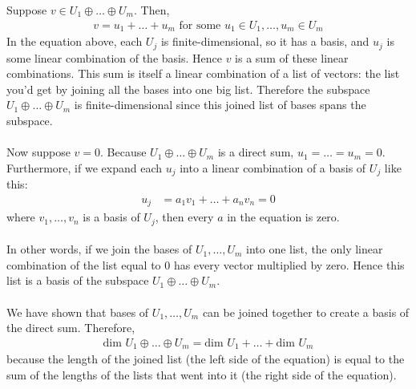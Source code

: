 \documentclass[a4paper]{article}
\begin{document}
\Large
Suppose $v \in U_1 \oplus \dots \oplus U_m$. Then, 
\begin{align*}
    v = u_1 + \dots + u_m \text{ for some } u_1 \in U_1, \dots, u_m \in U_m
\end{align*}
In the equation above, each $U_j$ is finite-dimensional, so it has a basis, and $u_j$ is some linear combination of the basis.
Hence $v$ is a sum of these linear combinations.
This sum is itself a linear combination of a list of vectors: the list you'd get by joining all the bases into one big list.
Therefore the subspace $U_1\oplus\dots\oplus U_m$ is finite-dimensional since this joined list of bases spans the subspace.
\\
\\
Now suppose $v=0$.
Because $U_1\oplus\dots\oplus U_m$ is a direct sum, $u_1=\dots=u_m=0$.
Furthermore, if we expand each $u_j$ into a linear combination of a basis of $U_j$ like this:
\begin{align*}
    u_j &= a_1v_1 + \dots + a_nv_n = 0
\end{align*}
where $v_1,\dots,v_n$ is a basis of $U_j$, then every $a$ in the equation is zero.
\\
\\
In other words, if we join the bases of $U_1,\dots,U_m$ into one list, the only linear combination of the list equal to 0 has every vector multiplied by zero.
Hence this list is a basis of the subspace $U_1\oplus\dots\oplus U_m$.
\\
\\
We have shown that bases of $U_1,\dots,U_m$ can be joined together to create a basis of the direct sum.
Therefore,
\begin{align*}
    \text{dim }U_1\oplus\dots\oplus U_m = \text{dim }U_1+\dots+\text{dim }U_m
\end{align*}
because the length of the joined list (the left side of the equation) is equal to the sum of the lengths of the lists that went into it (the right side of the equation).
\end{document}
